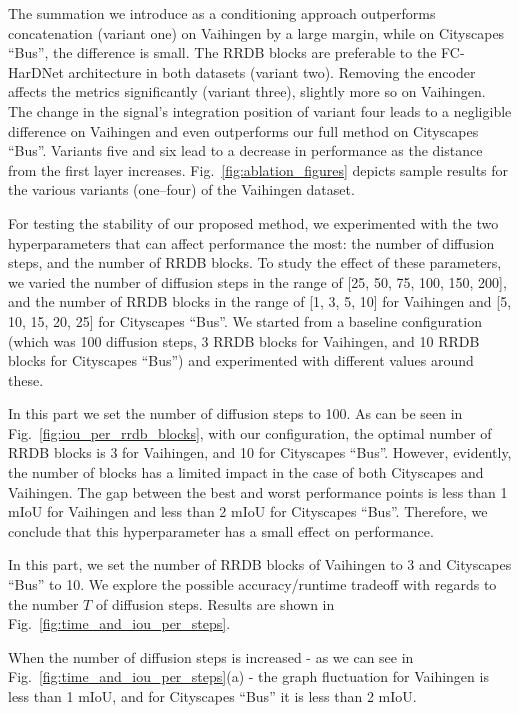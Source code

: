 \documentclass[10pt,twocolumn,letterpaper]{article}
\begin{document}
The summation we introduce as a conditioning approach outperforms concatenation (variant one) on Vaihingen by a large margin, while on Cityscapes ``Bus'', the difference is small. The RRDB blocks are preferable to the FC-HarDNet architecture in both datasets (variant two). Removing the encoder affects the metrics significantly (variant three), slightly more so on Vaihingen. The change in the signal's integration position of variant four leads to a negligible difference on Vaihingen and even outperforms our full method on Cityscapes ``Bus''. Variants five and six lead to a decrease in performance as the distance from the first layer increases. Fig.~\ref{fig:ablation_figures} depicts sample results for the various variants (one--four) of the Vaihingen dataset. 

 For testing the stability of our proposed method, we experimented with the two hyperparameters that can affect performance the most: the number of diffusion steps, and the number of RRDB blocks. To study the effect of these parameters, we varied the number of diffusion steps in the range of [25, 50, 75, 100, 150, 200], and the number of RRDB blocks in the range of [1, 3, 5, 10] for Vaihingen and [5, 10, 15, 20, 25] for Cityscapes ``Bus''. We started from a baseline configuration (which was 100 diffusion steps, 3 RRDB blocks for Vaihingen, and 10 RRDB blocks for Cityscapes ``Bus'') and experimented with different values around these. 

In this part we set the number of diffusion steps to 100. As can be seen in Fig.~\ref{fig:iou_per_rrdb_blocks}, with our configuration, the optimal number of RRDB blocks is 3 for Vaihingen, and 10 for Cityscapes ``Bus''. However, evidently, the number of blocks has a limited impact in the case of both Cityscapes and Vaihingen. The gap between the best and worst performance points is less than 1 mIoU for Vaihingen and less than 2 mIoU for Cityscapes ``Bus''. Therefore, we conclude that this hyperparameter has a small effect on performance.

\label{subsec:varying_diffusion_steps}
In this part, we set the number of RRDB blocks of Vaihingen to 3 and Cityscapes ``Bus'' to 10.
We explore the possible accuracy/runtime tradeoff with regards to the number $T$ of diffusion steps. Results are shown in Fig.~\ref{fig:time_and_iou_per_steps}.

When the number of diffusion steps is increased - as we can see in Fig.~\ref{fig:time_and_iou_per_steps}(a) - the graph fluctuation for Vaihingen is less than 1 mIoU, and for Cityscapes ``Bus'' it is less than 2 mIoU.
\end{document}
